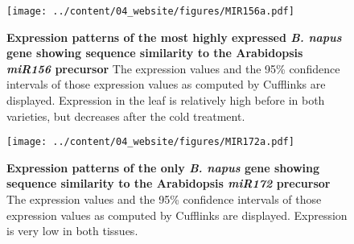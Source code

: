 \documentclass[12pt,]{book}
\begin{document}
\begin{figure}[htbp]
\centering
\texttt{[image: ../content/04\_website/figures/MIR156a.pdf]}
\caption{\textbf{Expression patterns of the most highly expressed
\emph{B. napus} gene showing sequence similarity to the Arabidopsis
\emph{miR156} precursor} The expression values and the 95\% confidence
intervals of those expression values as computed by Cufflinks are
displayed. Expression in the leaf is relatively high before in both
varieties, but decreases after the cold
treatment.}\label{figure:winter:mir156}
\end{figure}

\begin{figure}[htbp]
\centering
\texttt{[image: ../content/04\_website/figures/MIR172a.pdf]}
\caption{\textbf{Expression patterns of the only \emph{B. napus} gene
showing sequence similarity to the Arabidopsis \emph{miR172} precursor}
The expression values and the 95\% confidence intervals of those
expression values as computed by Cufflinks are displayed. Expression is
very low in both tissues.}\label{figure:winter:mir172}
\end{figure}
\end{document}
